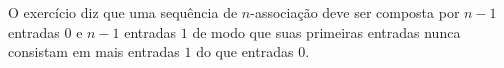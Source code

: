 \begin{comment}
Agora, resta mostrar a unicidade. Sejam $s^{(0)}, s^{(1)}, z^{(0)}, z^{(1)}$ sequência de associação tais que $s = (0,s^{(0)},1,s^{(1)}) = (0,z^{(0)},1,z^{(1)})$. Primeiro mostremos que $s^{(0)} = z^{(0)}$. Sejam $n_0$ e $m_0$ seus respectivos graus. Se $n_0 = m_0$, segue que $s^{(0)}=z^{(0)}$ pois, para todo $i \in [n_0]$ vale $s^{(0)}_i = s_{i+1} = z^{(0)}_i$; o caso em que $n_0 \neq m_0$ não ocorre, pois consideremos sem perda de generalidade que $n_0 < m_0$. Então, como para todo $i \in [n_0]$ valeria $s^{(0)}_i = s_{i+1} = z^{(0)}_i$, deveria valer que $1 = s_{n_0} = z^{(0)}_{n_0}$. Mas, como $s^{(0)}$ é sequência de associação, valeria
	\begin{equation*}
	\card{\set{i \in [2n_0]}{s^{(0)}_i=1}} = n_0,
	\end{equation*}
e isso implicaria que
	\begin{equation*}
	\card{\set{i \in [2n_0+1]}{z^{(0)}_i=1}} = n_0 + 1 > n_0
	\end{equation*}
o que significaria que $z^{(0)}$ não é sequência de associação, uma contradição. Assim concluímos que $s^{(0)}=z^{(0)}$ e, portanto, segue que $s^{(1)}=z^{(1)}$.
\end{proof}

\end{comment}

O exercício diz que uma sequência de $n$-associação deve ser composta por $n-1$ entradas $0$ e $n-1$ entradas $1$ de modo que suas primeiras entradas nunca consistam em mais entradas $1$ do que entradas $0$.

